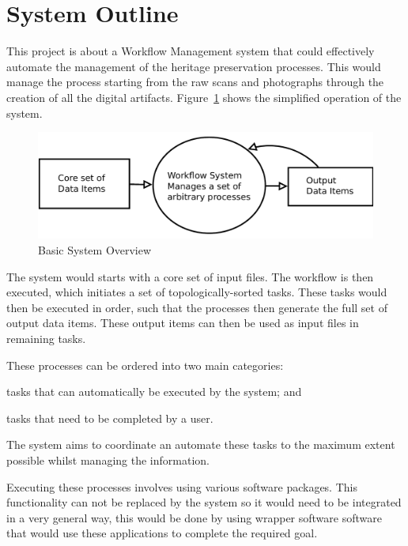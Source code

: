\section{System Outline}
    This project is about a Workflow Management system that could effectively
    automate the management of the heritage preservation processes.
	This would manage the process starting from the raw scans and photographs
	through the creation of all the digital artifacts. Figure~\ref{intro:basic}
	shows the simplified operation of the system.
	\begin{figure}[!h]
		\begin{center}
			\includegraphics[scale=0.34]{figures/basic_system.pdf}
		\end{center}
		\caption{Basic System Overview}
		\label{intro:basic}
	\end{figure}

	\noindent The system would starts with a
	core set of input files. The workflow is then executed, which initiates a set
	of topologically-sorted tasks. These tasks would then be executed in order, such that
    the processes then generate the full set of output data items. These output items can then
    be used as input files in remaining tasks.

    These processes can be ordered into two main categories:
    \begin{inparaenum}[(i)]
        \item tasks that can automatically be executed by the system; and 
        \item tasks that need to be completed by a user.
    \end{inparaenum} The system aims to coordinate an automate these tasks to
    the maximum extent possible whilst managing the information.

    Executing these processes involves using various software packages.
    This functionality can not be replaced by the system so it would need
    to be integrated in a very general way, this would be done by using wrapper
    software software that would use these applications to complete the required goal.

